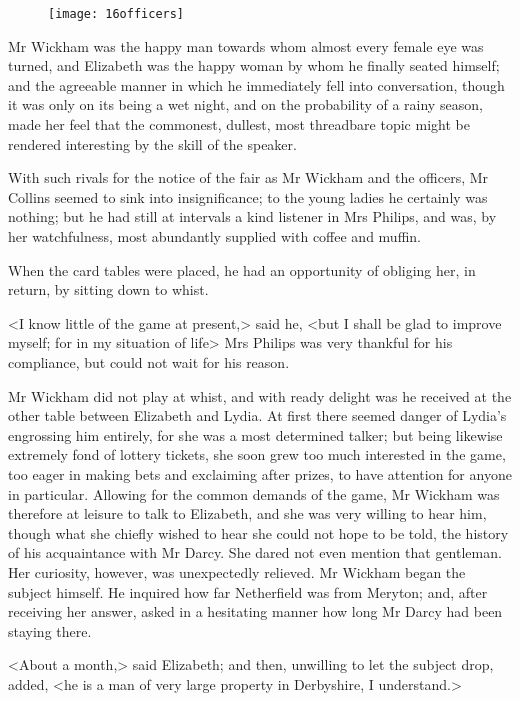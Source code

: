 \begin{figure}[tbh]
\centering
\texttt{[image: 16officers]}
\end{figure}


Mr Wickham was the happy man towards whom almost every female eye was turned, and Elizabeth was the happy woman by whom he finally seated himself; and the agreeable manner in which he immediately fell into conversation, though it was only on its being a wet night, and on the probability of a rainy season, made her feel that the commonest, dullest, most threadbare topic might be rendered interesting by the skill of the speaker.

With such rivals for the notice of the fair as Mr Wickham and the officers, Mr Collins seemed to sink into insignificance; to the young ladies he certainly was nothing; but he had still at intervals a kind listener in Mrs Philips, and was, by her watchfulness, most abundantly supplied with coffee and muffin.

When the card tables were placed, he had an opportunity of obliging her, in return, by sitting down to whist.

<I know little of the game at present,> said he, <but I shall be glad to improve myself; for in my situation of life\longdash> Mrs Philips was very thankful for his compliance, but could not wait for his reason.

Mr Wickham did not play at whist, and with ready delight was he received at the other table between Elizabeth and Lydia. At first there seemed danger of Lydia's engrossing him entirely, for she was a most determined talker; but being likewise extremely fond of lottery tickets, she soon grew too much interested in the game, too eager in making bets and exclaiming after prizes, to have attention for anyone in particular. Allowing for the common demands of the game, Mr Wickham was therefore at leisure to talk to Elizabeth, and she was very willing to hear him, though what she chiefly wished to hear she could not hope to be told, the history of his acquaintance with Mr Darcy. She dared not even mention that gentleman. Her curiosity, however, was unexpectedly relieved. Mr Wickham began the subject himself. He inquired how far Netherfield was from Meryton; and, after receiving her answer, asked in a hesitating manner how long Mr Darcy had been staying there.

<About a month,> said Elizabeth; and then, unwilling to let the subject drop, added, <he is a man of very large property in Derbyshire, I understand.>


